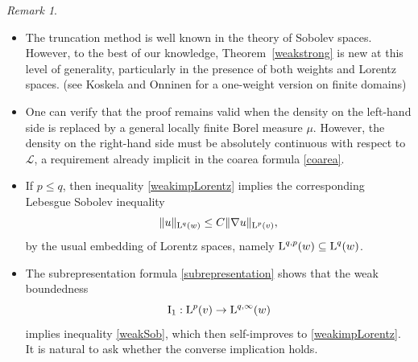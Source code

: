 \documentclass[11pt, a4paper, reqno]{amsart}
\newcommand{\Lup}{\textup{L}}
\newcommand{\Leb}{\mathcal{L}}
\theoremstyle{definition}
\theoremstyle{remark}
\newtheorem{remark}[theorem]{Remark}
\begin{document}
\begin{remark}


\begin{itemize}

\item The truncation method is well known in the theory of Sobolev spaces.  
However, to the best of our knowledge, Theorem~\ref{weakstrong} is new at this level of generality, particularly in the presence of both weights and Lorentz spaces.  (see Koskela and Onninen \cite{KO} for a one-weight version on finite domains) 


\item One can verify that the proof remains valid when the density on the left-hand side is replaced by a general locally finite Borel measure $\mu$.  
However, the density on the right-hand side must be absolutely continuous with respect to $\Leb$, a requirement already implicit in the coarea formula \eqref{coarea}.

\item If $p \le q$, then inequality \eqref{weakimpLorentz} implies the corresponding Lebesgue Sobolev inequality
\[
\|u\|_{\Lup^{q}(w)} \le C \|\nabla u\|_{\Lup^{p}(v)},
\]
by the usual embedding of Lorentz spaces, namely $\Lup^{q,p}(w)\subseteq \Lup^{q}(w)$.

\item The subrepresentation formula \eqref{subrepresentation} shows that the weak boundedness
\[
\textup{I}_1 : \Lup^p(v) \to \Lup^{q,\infty}(w)
\]
implies inequality \eqref{weakSob}, which then self-improves to \eqref{weakimpLorentz}. It is natural to ask whether the converse implication holds.
\end{itemize}
\end{remark}
\end{document}
